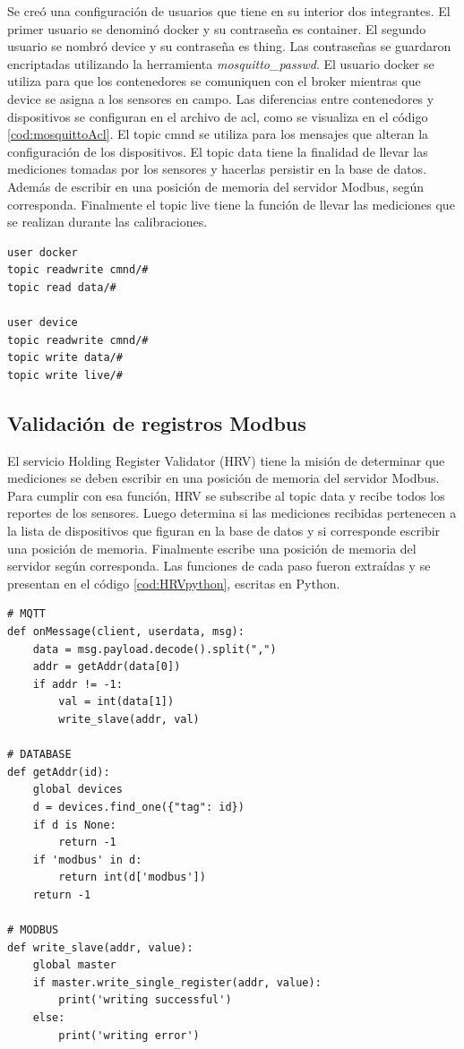Se creó una configuración de usuarios que tiene en su interior dos integrantes.
El primer usuario se denominó docker y su contraseña es container.
El segundo usuario se nombró device y su contraseña es thing.
Las contraseñas se guardaron encriptadas utilizando la herramienta \emph{mosquitto\_passwd}.
El usuario docker se utiliza para que los contenedores se comuniquen con el broker mientras que device se asigna a los sensores en campo.
Las diferencias entre contenedores y dispositivos se configuran en el archivo de acl, como se visualiza en el código \ref{cod:mosquittoAcl}.
El topic cmnd se utiliza para los mensajes que alteran la configuración de los dispositivos.
El topic data tiene la finalidad de llevar las mediciones tomadas por los sensores y hacerlas persistir en la base de datos.
Además de escribir en una posición de memoria del servidor Modbus, según corresponda.
Finalmente el topic live tiene la función de llevar las mediciones que se realizan durante las calibraciones.

\newpage

\begin{lstlisting}[label=cod:mosquittoAcl,caption=Lista de control de acceso]
user docker
topic readwrite cmnd/#
topic read data/#

user device
topic readwrite cmnd/#
topic write data/#
topic write live/#
\end{lstlisting}

\subsection{Validación de registros Modbus}

El servicio Holding Register Validator (HRV) tiene la misión de determinar que mediciones se deben escribir en una posición de memoria del servidor Modbus.
Para cumplir con esa función, HRV se subscribe al topic data y recibe todos los reportes de los sensores.
Luego determina si las mediciones recibidas pertenecen a la lista de dispositivos que figuran en la base de datos y si corresponde escribir una posición de memoria.
Finalmente escribe una posición de memoria del servidor según corresponda.
Las funciones de cada paso fueron extraídas y se presentan en el código \ref{cod:HRVpython}, escritas en Python.


\begin{lstlisting}[label=cod:HRVpython,caption=Funciones principales del servicio HRV]
# MQTT
def onMessage(client, userdata, msg):
    data = msg.payload.decode().split(",")
    addr = getAddr(data[0])
    if addr != -1:
        val = int(data[1])
        write_slave(addr, val)
        
# DATABASE
def getAddr(id):
    global devices
    d = devices.find_one({"tag": id})
    if d is None:
        return -1
    if 'modbus' in d:
        return int(d['modbus'])
    return -1

# MODBUS
def write_slave(addr, value):
    global master
    if master.write_single_register(addr, value):
        print('writing successful')
    else:
        print('writing error')
\end{lstlisting}


